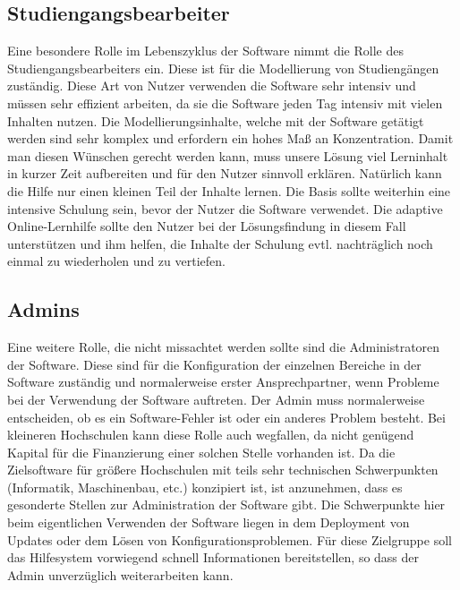 \subsection{Studiengangsbearbeiter}
Eine besondere Rolle im Lebenszyklus der Software nimmt die Rolle des Studiengangsbearbeiters ein. Diese ist für die Modellierung von Studiengängen zuständig. Diese Art von Nutzer verwenden die Software sehr intensiv und müssen sehr effizient arbeiten, da sie die Software jeden Tag intensiv mit vielen Inhalten nutzen. Die Modellierungsinhalte, welche mit der Software getätigt werden sind sehr komplex und erfordern ein hohes Maß an Konzentration. Damit man diesen Wünschen gerecht werden kann, muss unsere Lösung viel Lerninhalt in kurzer Zeit aufbereiten und für den Nutzer sinnvoll erklären. Natürlich kann die Hilfe nur einen kleinen Teil der Inhalte lernen. Die Basis sollte weiterhin eine intensive Schulung sein, bevor der Nutzer die Software verwendet. Die adaptive Online-Lernhilfe sollte den Nutzer bei der Lösungsfindung in diesem Fall unterstützen und ihm helfen, die Inhalte der Schulung evtl. nachträglich noch einmal zu wiederholen und zu vertiefen.

\subsection{Admins}
Eine weitere Rolle, die nicht missachtet werden sollte sind die Administratoren der Software. Diese sind für die Konfiguration der einzelnen Bereiche in der Software zuständig und normalerweise erster Ansprechpartner, wenn Probleme bei der Verwendung der Software auftreten. Der Admin muss normalerweise entscheiden, ob es ein Software-Fehler ist oder ein anderes Problem besteht. Bei kleineren Hochschulen kann diese Rolle auch wegfallen, da nicht genügend Kapital für die Finanzierung einer solchen Stelle vorhanden ist. Da die Zielsoftware für größere Hochschulen mit teils sehr technischen Schwerpunkten (Informatik, Maschinenbau, etc.) konzipiert ist, ist anzunehmen, dass es gesonderte Stellen zur Administration der Software gibt. Die Schwerpunkte hier beim eigentlichen Verwenden der Software liegen in dem Deployment von Updates oder dem Lösen von Konfigurationsproblemen. Für diese Zielgruppe soll das Hilfesystem vorwiegend schnell Informationen bereitstellen, so dass der Admin unverzüglich weiterarbeiten kann.

